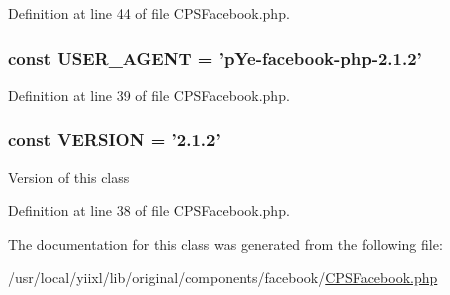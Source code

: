 Definition at line 44 of file CPSFacebook.php.

\hypertarget{classCPSFacebook_aad50057168703fbd6bcab2c2c6e4d628}{
\subsubsection[{USER\_\-AGENT}]{\setlength{\rightskip}{0pt plus 5cm}const {\bf USER\_\-AGENT} = 'pYe-\/facebook-\/php-\/2.1.2'}}
\label{classCPSFacebook_aad50057168703fbd6bcab2c2c6e4d628}


Definition at line 39 of file CPSFacebook.php.

\hypertarget{classCPSFacebook_af71005841ce53adac00581ab0ba24c1f}{
\subsubsection[{VERSION}]{\setlength{\rightskip}{0pt plus 5cm}const {\bf VERSION} = '2.1.2'}}
\label{classCPSFacebook_af71005841ce53adac00581ab0ba24c1f}
Version of this class 

Definition at line 38 of file CPSFacebook.php.



The documentation for this class was generated from the following file:\begin{DoxyCompactItemize}
\item 
/usr/local/yiixl/lib/original/components/facebook/\hyperlink{CPSFacebook_8php}{CPSFacebook.php}\end{DoxyCompactItemize}
